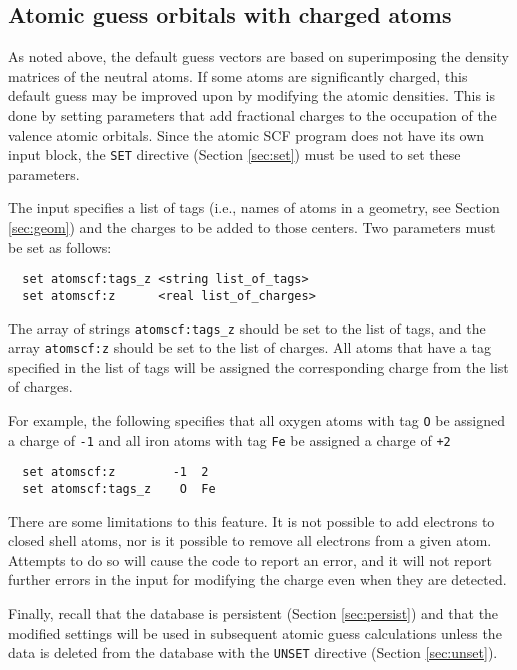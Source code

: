 \subsection{Atomic guess orbitals with charged atoms}
\label{sec:atomscf}

As noted above, the default guess vectors are based on superimposing
the density matrices of the neutral atoms.  If some atoms are
significantly charged, this default guess may be improved upon by
modifying the atomic densities.  This is done by setting parameters
that add fractional charges to the occupation of the valence atomic
orbitals.  Since the atomic SCF program does not have its own input
block, the \verb+SET+ directive (Section \ref{sec:set}) must be used
to set these parameters.

The input specifies a list of tags (i.e., names of atoms in a
geometry, see Section \ref{sec:geom}) and the charges to be added to
those centers.  Two parameters must be set as follows:
\begin{verbatim}
  set atomscf:tags_z <string list_of_tags>
  set atomscf:z      <real list_of_charges>
\end{verbatim}

\sloppy

The array of strings \verb+atomscf:tags_z+ should be set to the list
of tags, and the array \verb+atomscf:z+ should be set to the list of
charges.  All atoms that have a tag specified in the list of tags will
be assigned the corresponding charge from the list of charges.

\fussy

For example, the following specifies that all oxygen atoms with tag
\verb+O+ be assigned a charge of \verb+-1+ and all iron atoms with tag
\verb+Fe+ be assigned a charge of \verb=+2=
\begin{verbatim}
  set atomscf:z        -1  2
  set atomscf:tags_z    O  Fe
\end{verbatim}

There are some limitations to this feature.  It is not possible to add
electrons to closed shell atoms, nor is it possible to remove all
electrons from a given atom.  Attempts to do so will cause the code to
report an error, and it will not report further errors in the input
for modifying the charge even when they are detected.

Finally, recall that the database is persistent (Section
\ref{sec:persist}) and that the modified settings will be used in
subsequent atomic guess calculations unless the data is deleted from
the database with the \verb+UNSET+ directive (Section
\ref{sec:unset}).

